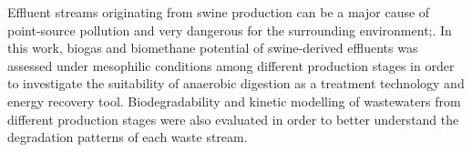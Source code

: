 Effluent streams originating from swine production can be a major cause of point-source pollution and very dangerous for the surrounding environment;. In this work, biogas and biomethane potential of swine-derived effluents was assessed under mesophilic conditions among different production stages in order to investigate the suitability of anaerobic digestion as a treatment technology and energy recovery tool. Biodegradability and kinetic modelling of wastewaters from different production stages were also evaluated in order to better understand the degradation patterns of each waste stream.